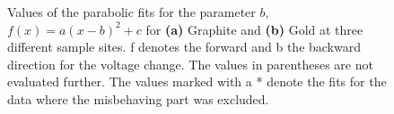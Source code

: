 \documentclass[a4paper]{scrartcl}
\numberwithin{equation}{section}
\numberwithin{figure}{section}
\numberwithin{table}{section}
\begin{document}
\begin{figure} 
\small
 \centering
{}
 \hfill
{}
\caption{
\small  Values of the parabolic fits for the parameter $b$, $f(x)=a(x-b)^2+c$ for \textbf{(a)} Graphite and \textbf{(b)} Gold at three different sample sites. f denotes the forward and b the backward direction for the voltage change. The values in parentheses are not evaluated further. The values marked with a * denote the fits for the data where the misbehaving part was excluded.  } 
	\label{fig:bwerte}
\end{figure}
\end{document}
